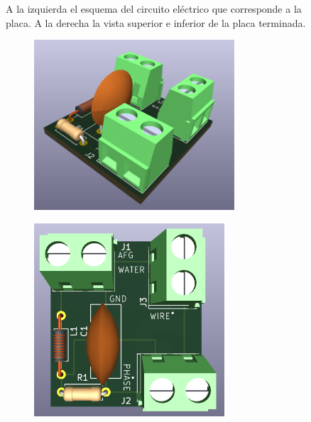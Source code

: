 \begin{figure}[!ht]
\begin{minipage}[c]{0.3321249\textwidth}
\begin{subfigure}{\textwidth}
			\captionsetup{width=0.8\textwidth}
			\subcaption{}
		\end{subfigure}
	\end{minipage}
	\caption{A la izquierda el esquema del circuito eléctrico que corresponde a la placa. A la derecha la vista superior e inferior de la placa terminada.} %
	\label{fig:}
\end{figure}




\begin{figure}[!ht]
	\begin{minipage}[c]{0.5\textwidth}
			\begin{subfigure}{\textwidth}
					\centering
					\includegraphics[width=0.82\textwidth]{Figures/02_06_2025/PCB_3D_perfil_borneras1}
					\captionsetup{width=0.8\textwidth}
					\subcaption{}
				\end{subfigure}
		\end{minipage}\begin{minipage}[c]{0.49\textwidth}
			\begin{subfigure}{\textwidth}
					\centering
					\includegraphics[width=0.78\textwidth]{Figures/02_06_2025/PCB_3D_top_borneras}

\end{subfigure}
\end{minipage}
\end{figure}
